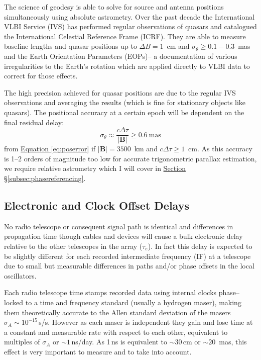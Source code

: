 		The science of geodesy is able to solve for source and antenna positions simultaneously using absolute astrometry. Over the past decade the International VLBI Service (IVS) has performed regular observations of quasars and catalogued the International Celestial Reference Frame (ICRF). They are able to measure baseline lengths and quasar positions up to $\Delta B=1$~cm and $\sigma_\theta\ge0.1-0.3$~mas and the Earth Orientation Parameters (EOPs)-- a documentation of various irregularities to the Earth's rotation which are applied directly to VLBI data to correct for those effects.
		
		The high precision achieved for quasar positions are due to the regular IVS observations and averaging the results (which is fine for stationary objects like quasars). The positional accuracy at a certain epoch will be dependent on the final residual delay:
		\begin{equation}
			\sigma_\theta \approx \frac{c\Delta\tau}{|\textbf{B}|} \ge 0.6~\text{mas}
			\label{eq:astoerror}
		\end{equation} from \hyperref[eq:poserror]{Equation \ref*{eq:poserror}} if $|\textbf{B}|=3500$~km and $c\Delta\tau\ge1$~cm. As this accuracy is 1--2 orders of magnitude too low for accurate trigonometric parallax estimation, we require relative astrometry which I will cover in \hyperref[subsec:phasereferencing]{Section \S \ref*{subsec:phasereferencing}}.
	
	\subsection{Electronic and Clock Offset Delays}
		No radio telescope or consequent signal path is identical and differences in propagation time though cables and devices will cause a bulk electronic delay relative to the other telescopes in the array ($\tau_e$). In fact this delay is expected to be slightly different for each recorded intermediate frequency (IF) at a telescope due to small but measurable differences in paths and/or phase offsets in the local oscillators. 
		
		Each radio telescope time stamps recorded data using internal clocks phase--locked to a time and frequency standard (usually a hydrogen maser), making them theoretically accurate to the Allen standard deviation of the masers $\sigma_A\sim10^{-15}$\,s/s. However as each maser is independent they gain and lose time at a constant and measurable rate with respect to each other, equivalent to multiples of $\sigma_A$ or $\sim1$\,ns/day. As 1\,ns is equivalent to $\sim30$\,cm or $\sim20$~mas, this effect is very important to measure and to take into account. 
		
